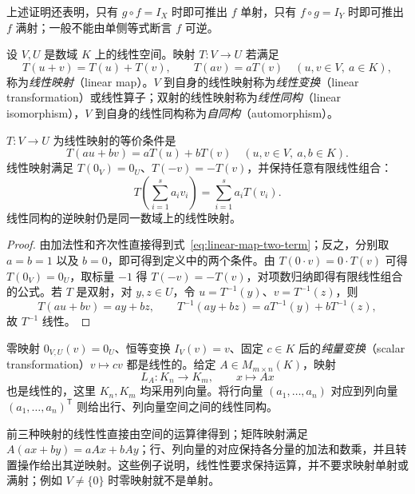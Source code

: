 上述证明还表明，只有 $g\circ f=I_X$ 时即可推出 $f$ 单射，只有 $f\circ g=I_Y$ 时即可推出 $f$ 满射；一般不能由单侧等式断言 $f$ 可逆。

\begin{definition}
\label{def:linear-map}
设 $V,U$ 是数域 $K$ 上的线性空间。映射 $T:V\to U$ 若满足
\[
    T(u+v)=T(u)+T(v),\qquad T(av)=aT(v)
    \quad(u,v\in V,\ a\in K),
\]
称为\emph{线性映射}（linear map）。$V$ 到自身的线性映射称为\emph{线性变换}（linear transformation）或线性算子；双射的线性映射称为\emph{线性同构}（linear isomorphism），$V$ 到自身的线性同构称为\emph{自同构}（automorphism）。
\end{definition}

\begin{proposition}
\label{prop:linear-map-basic}
$T:V\to U$ 为线性映射的等价条件是
\begin{equation}
\label{eq:linear-map-two-term}
    T(au+bv)=aT(u)+bT(v)
    \quad(u,v\in V,\ a,b\in K).
\end{equation}
线性映射满足 $T(0_V)=0_U$、$T(-v)=-T(v)$，并保持任意有限线性组合：
\[
    T\left(\sum_{i=1}^{s}a_iv_i\right)
    =\sum_{i=1}^{s}a_iT(v_i).
\]
线性同构的逆映射仍是同一数域上的线性映射。
\end{proposition}

\begin{proof}
由加法性和齐次性直接得到式~\eqref{eq:linear-map-two-term}；反之，分别取 $a=b=1$ 以及 $b=0$，即可得到定义中的两个条件。由 $T(0\cdot v)=0\cdot T(v)$ 可得 $T(0_V)=0_U$，取标量 $-1$ 得 $T(-v)=-T(v)$，对项数归纳即得有限线性组合的公式。若 $T$ 是双射，对 $y,z\in U$，令 $u=T^{-1}(y)$、$v=T^{-1}(z)$，则
\[
    T(au+bv)=ay+bz,
    \qquad T^{-1}(ay+bz)=aT^{-1}(y)+bT^{-1}(z),
\]
故 $T^{-1}$ 线性。
\end{proof}

\begin{example}
零映射 $0_{V,U}(v)=0_U$、恒等变换 $I_V(v)=v$、固定 $c\in K$ 后的\emph{纯量变换}（scalar transformation）$v\mapsto cv$ 都是线性的。给定 $A\in M_{m\times n}(K)$，映射
\[
    L_A:K_n\to K_m,\qquad x\mapsto Ax
\]
也是线性的，这里 $K_n,K_m$ 均采用列向量。将行向量 $(a_1,\ldots,a_n)$ 对应到列向量 $(a_1,\ldots,a_n)^{\mathsf T}$ 则给出行、列向量空间之间的线性同构。
\end{example}

\begin{solve}
前三种映射的线性性直接由空间的运算律得到；矩阵映射满足 $A(ax+by)=aAx+bAy$；行、列向量的对应保持各分量的加法和数乘，并且转置操作给出其逆映射。这些例子说明，线性性要求保持运算，并不要求映射单射或满射；例如 $V\ne\{0\}$ 时零映射就不是单射。
\end{solve}

